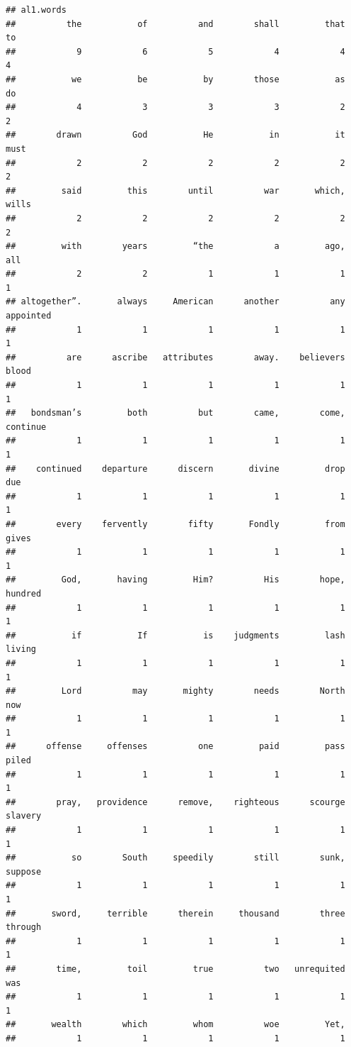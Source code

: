 \documentclass[
]{book}
\begin{document}
\begin{verbatim}
## al1.words
##          the           of          and        shall         that           to 
##            9            6            5            4            4            4 
##           we           be           by        those           as           do 
##            4            3            3            3            2            2 
##        drawn          God           He           in           it         must 
##            2            2            2            2            2            2 
##         said         this        until          war       which,        wills 
##            2            2            2            2            2            2 
##         with        years         “the            a         ago,          all 
##            2            2            1            1            1            1 
## altogether”.       always     American      another          any    appointed 
##            1            1            1            1            1            1 
##          are      ascribe   attributes        away.    believers        blood 
##            1            1            1            1            1            1 
##   bondsman’s         both          but        came,        come,     continue 
##            1            1            1            1            1            1 
##    continued    departure      discern       divine         drop          due 
##            1            1            1            1            1            1 
##        every    fervently        fifty       Fondly         from        gives 
##            1            1            1            1            1            1 
##         God,       having         Him?          His        hope,      hundred 
##            1            1            1            1            1            1 
##           if           If           is    judgments         lash       living 
##            1            1            1            1            1            1 
##         Lord          may       mighty        needs        North          now 
##            1            1            1            1            1            1 
##      offense     offenses          one         paid         pass        piled 
##            1            1            1            1            1            1 
##        pray,   providence      remove,    righteous      scourge      slavery 
##            1            1            1            1            1            1 
##           so        South     speedily        still        sunk,      suppose 
##            1            1            1            1            1            1 
##       sword,     terrible      therein     thousand        three      through 
##            1            1            1            1            1            1 
##        time,         toil         true          two   unrequited          was 
##            1            1            1            1            1            1 
##       wealth        which         whom          woe         Yet, 
##            1            1            1            1            1
\end{verbatim}
\end{document}
